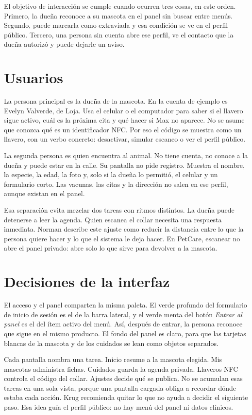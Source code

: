 \documentclass[12pt,a4paper]{article}
\begin{document}
El objetivo de interacción se cumple cuando ocurren tres cosas, en este orden. Primero, la dueña reconoce a su mascota en el panel sin buscar entre menús. Segundo, puede marcarla como extraviada y esa condición se ve en el perfil público. Tercero, una persona sin cuenta abre ese perfil, ve el contacto que la dueña autorizó y puede dejarle un aviso.

\section{Usuarios}

La persona principal es la dueña de la mascota. En la cuenta de ejemplo es Evelyn Valverde, de Loja. Usa el celular o el computador para saber si el llavero sigue activo, cuál es la próxima cita y qué hacer si Max no aparece. No se asume que conozca qué es un identificador NFC. Por eso el código se muestra como un llavero, con un verbo concreto: desactivar, simular escaneo o ver el perfil público.

La segunda persona es quien encuentra al animal. No tiene cuenta, no conoce a la dueña y puede estar en la calle. Su pantalla no pide registro. Muestra el nombre, la especie, la edad, la foto y, solo si la dueña lo permitió, el celular y un formulario corto. Las vacunas, las citas y la dirección no salen en ese perfil, aunque existan en el panel.

Esa separación evita mezclar dos tareas con ritmos distintos. La dueña puede detenerse a leer la agenda. Quien escanea el collar necesita una respuesta inmediata. Norman describe este ajuste como reducir la distancia entre lo que la persona quiere hacer y lo que el sistema le deja hacer. En PetCare, escanear no abre el panel privado: abre solo lo que sirve para devolver a la mascota.

\section{Decisiones de la interfaz}

El acceso y el panel comparten la misma paleta. El verde profundo del formulario de inicio de sesión es el de la barra lateral, y el verde menta del botón \emph{Entrar al panel} es el del ítem activo del menú. Así, después de entrar, la persona reconoce que sigue en el mismo producto. El fondo del panel es claro, para que las tarjetas blancas de la mascota y de los cuidados se lean como objetos separados.

Cada pantalla nombra una tarea. Inicio resume a la mascota elegida. Mis mascotas administra fichas. Cuidados guarda la agenda privada. Llaveros NFC controla el código del collar. Ajustes decide qué se publica. No se acumulan esas tareas en una sola vista, porque una pantalla cargada obliga a recordar dónde estaba cada acción. Krug recomienda quitar lo que no ayuda a decidir el siguiente paso. Esa idea guía el perfil público: no hay menú del panel ni datos clínicos.
\end{document}
